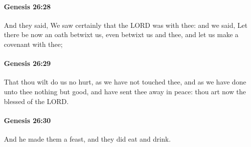 		\paragraph{Genesis 26:28} %
			\label{GENESIS-26-28}

			And they said, We saw certainly that the LORD was with thee: and we said, Let there be now an oath betwixt us, even betwixt us and thee, and let us make a covenant with thee;


		\paragraph{Genesis 26:29} %
			\label{GENESIS-26-29}

			That thou wilt do us no hurt, as we have not touched thee, and as we have done unto thee nothing but good, and have sent thee away in peace: thou art now the blessed of the LORD.


		\paragraph{Genesis 26:30} %
			\label{GENESIS-26-30}

			And he made them a feast, and they did eat and drink.


